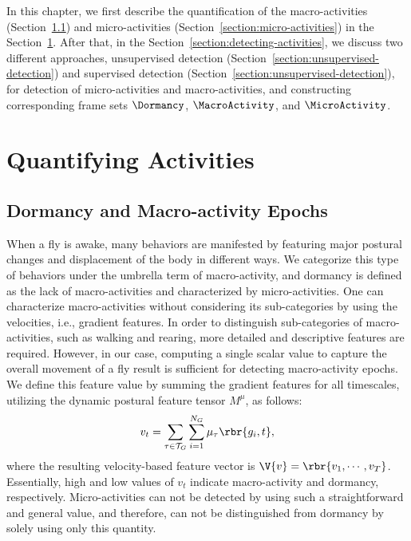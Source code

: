 In this chapter, we first describe the quantification of the macro-activities (Section~\ref{section:dormancy-and-macroactivity}) and micro-activities (Section~\ref{section:micro-activities}) in the Section~\ref{section:quantifying-activities}.
After that, in the Section~\ref{section:detecting-activities}, we discuss two different approaches, unsupervised detection (Section~\ref{section:unsupervised-detection}) and supervised detection (Section~\ref{section:unsupervised-detection}), for detection of micro-activities and macro-activities, and constructing corresponding frame sets $\Dormancy$, $\MacroActivity$, and $\MicroActivity$.

\section{Quantifying Activities}\label{section:quantifying-activities} \subsection{Dormancy and Macro-activity Epochs}\label{section:dormancy-and-macroactivity}
When a fly is awake, many behaviors are manifested by featuring major postural changes and displacement of the body in different ways.
We categorize this type of behaviors under the umbrella term of macro-activity, and dormancy is defined as the lack of macro-activities and characterized by micro-activities.
One can characterize macro-activities without considering its sub-categories by using the velocities, i.e., gradient features.
In order to distinguish sub-categories of macro-activities, such as walking and rearing, more detailed and descriptive features are required.
However, in our case, computing a single scalar value to capture the overall movement of a fly result is  sufficient  for detecting macro-activity epochs. We define this feature value by summing the gradient features for all timescales, utilizing the dynamic postural feature tensor $M^\mu$, as follows:
\begin{equation}\label{equation:displacement}
	v_t = \sum_{\tau \in \mathcal{T}_G}{\sum_{i=1}^{N_G}{\mu_\tau\rbr{g_i,t}}},
\end{equation}
where the resulting velocity-based feature vector is $\V{v}=\rbr{v_1, \cdots, v_T}$. Essentially, high and low values of $v_t$ indicate macro-activity and dormancy, respectively. Micro-activities can not be detected by using such a straightforward and general value, and therefore, can not be distinguished from dormancy by solely using only this quantity.

